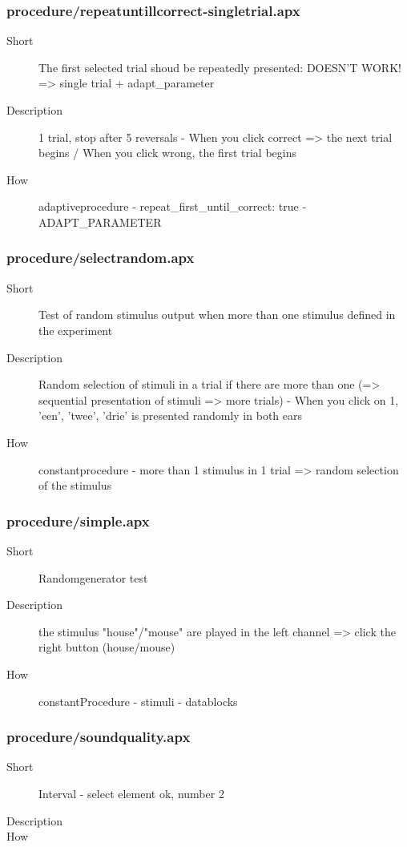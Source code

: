 \subsubsection{procedure/repeatuntillcorrect-singletrial.apx}
\begin{description}
\item[Short] 
 The first selected trial shoud be repeatedly presented: DOESN'T WORK! =\textgreater{} single trial + adapt\_parameter
\item[Description] 
 1 trial, stop after 5 reversals - When you click correct =\textgreater{} the next trial begins / When you click wrong, the first trial begins
\item[How] 
 adaptiveprocedure - repeat\_first\_until\_correct: true - ADAPT\_PARAMETER
\end{description}

\subsubsection{procedure/selectrandom.apx}
\begin{description}
\item[Short] 
 Test of random stimulus output when more than one stimulus defined in the experiment
\item[Description] 
 Random selection of stimuli in a trial if there are more than one (=\textgreater{} sequential presentation of stimuli =\textgreater{} more trials) - When you click on 1, 'een', 'twee', 'drie' is presented randomly in both ears
\item[How] 
 constantprocedure - more than 1 stimulus in 1 trial =\textgreater{} random selection of the stimulus
\end{description}

\subsubsection{procedure/simple.apx}
\begin{description}
\item[Short] 
 Randomgenerator test
\item[Description] 
 the stimulus "house"/"mouse" are played in the left channel =\textgreater{} click the right button (house/mouse)
\item[How] 
 constantProcedure - stimuli - datablocks
\end{description}

\subsubsection{procedure/soundquality.apx}
\begin{description}
\item[Short] 
 Interval - select element ok, number 2
\item[Description] 

\item[How] 

\end{description}

